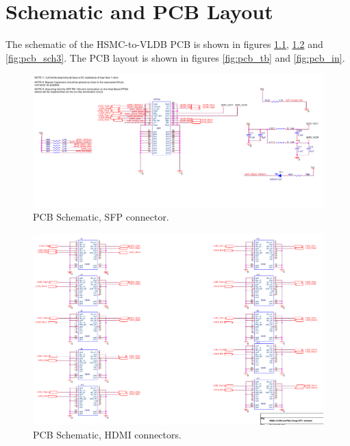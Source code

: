 \documentclass[main.tex]{subfiles}
\begin{document}
\chapter{Schematic and PCB Layout} 

The schematic of the HSMC-to-VLDB PCB is shown in figures \ref{fig:pcb_sch1}, \ref{fig:pcb_sch2} and \ref{fig:pcb_sch3}. The PCB layout is shown in figures \ref{fig:pcb_tb} and \ref{fig:pcb_in}.

\begin{figure} %
\begin{center}
\includegraphics[width=1\linewidth]{../img/pcb_sch1}
\caption{PCB Schematic, SFP connector.}
\label{fig:pcb_sch1}
\end{center}
\end{figure}

\begin{figure} %
\begin{center}
\includegraphics[width=1\linewidth]{../img/pcb_sch2}
\caption{PCB Schematic, HDMI connectors.}
\label{fig:pcb_sch2}
\end{center}
\end{figure}
\end{document}
